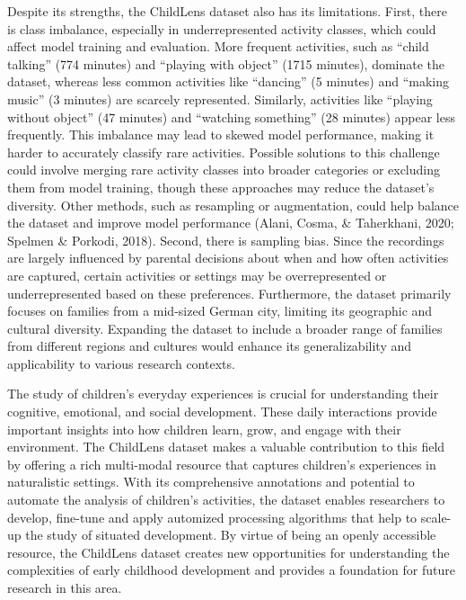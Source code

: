 \documentclass[
  man,floatsintext]{apa6}
\begin{document}
Despite its strengths, the ChildLens dataset also has its limitations. First, there is class imbalance, especially in underrepresented activity classes, which could affect model training and evaluation. More frequent activities, such as ``child talking'' (774 minutes) and ``playing with object'' (1715 minutes), dominate the dataset, whereas less common activities like ``dancing'' (5 minutes) and ``making music'' (3 minutes) are scarcely represented. Similarly, activities like ``playing without object'' (47 minutes) and ``watching something'' (28 minutes) appear less frequently. This imbalance may lead to skewed model performance, making it harder to accurately classify rare activities. Possible solutions to this challenge could involve merging rare activity classes into broader categories or excluding them from model training, though these approaches may reduce the dataset's diversity. Other methods, such as resampling or augmentation, could help balance the dataset and improve model performance (Alani, Cosma, \& Taherkhani, 2020; Spelmen \& Porkodi, 2018). Second, there is sampling bias. Since the recordings are largely influenced by parental decisions about when and how often activities are captured, certain activities or settings may be overrepresented or underrepresented based on these preferences. Furthermore, the dataset primarily focuses on families from a mid-sized German city, limiting its geographic and cultural diversity. Expanding the dataset to include a broader range of families from different regions and cultures would enhance its generalizability and applicability to various research contexts.

The study of children's everyday experiences is crucial for understanding their cognitive, emotional, and social development. These daily interactions provide important insights into how children learn, grow, and engage with their environment. The ChildLens dataset makes a valuable contribution to this field by offering a rich multi-modal resource that captures children's experiences in naturalistic settings. With its comprehensive annotations and potential to automate the analysis of children's activities, the dataset enables researchers to develop, fine-tune and apply automized processing algorithms that help to scale-up the study of situated development. By virtue of being an openly accessible resource, the ChildLens dataset creates new opportunities for understanding the complexities of early childhood development and provides a foundation for future research in this area.
\end{document}
